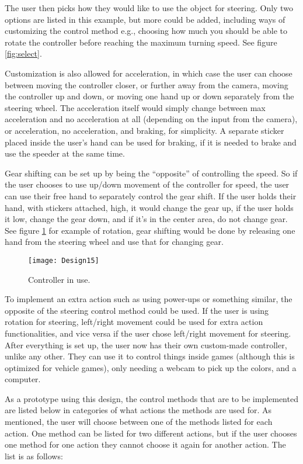 The user then picks how they would like to use the object for steering. Only two options are listed in this example, but more could be added, including ways of customizing the control method e.g., choosing how much you should be able to rotate the controller before reaching the maximum turning speed. See figure \ref{fig:select}.
\bigskip

Customization is also allowed for acceleration, in which case the user can choose between moving the controller closer, or further away from the camera, moving the controller up and down, or moving one hand up or down separately from the steering wheel. 
The acceleration itself would simply change between max acceleration and no acceleration at all (depending on the input from the camera), or acceleration, no acceleration, and braking, for simplicity. A separate sticker placed inside the user's hand can be used for braking, if it is needed to brake and use the speeder at the same time.
\bigskip

Gear shifting can be set up by being the “opposite” of controlling the speed. So if the user chooses to use up/down movement of the controller for speed, the user can use their free hand to separately control the gear shift. If the user holds their hand, with stickers attached, high, it would change the gear up, if the user holds it low, change the gear down, and if it's in the center area, do not change gear. See figure \ref{fig:design15} for example of rotation, gear shifting would be done by releasing one hand from the steering wheel and use that for changing gear.

\begin{figure}[!htbp]
\centering
\texttt{[image: Design15]}
\caption{Controller in use.}
\label{fig:design15}
\end{figure}

To implement an extra action such as using power-ups or something similar, the opposite
of the steering control method could be used. If the user is using rotation for steering,
left/right movement could be used for extra action functionalities, and vice versa if the user
chose left/right movement for steering. After everything is set up, the user now has their own custom-made controller, unlike any other. They can use it to control things inside games (although this is optimized for vehicle games), only needing a webcam to pick up the colors, and a computer.
\bigskip

As a prototype using this design, the control methods that are to be implemented are listed below in categories of what actions the methods are used for. As mentioned, the user will choose between one of the methods listed for each action. One method can be listed for two different actions, but if the user chooses one method for one action they cannot choose it again for another action. The list is as follows:

